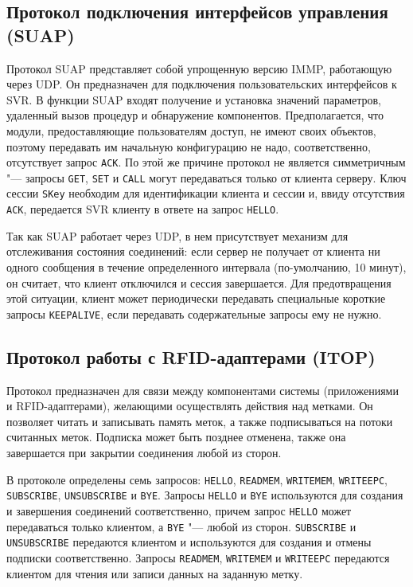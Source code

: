 \subsection{Протокол подключения интерфейсов управления (SUAP)}\label{sec:ch5_suap}

Протокол SUAP представляет собой упрощенную версию IMMP, работающую через UDP. Он предназначен для подключения пользовательских интерфейсов к SVR. В функции SUAP входят получение и установка значений параметров, удаленный вызов процедур и обнаружение компонентов. Предполагается, что модули, предоставляющие пользователям доступ, не имеют своих объектов, поэтому передавать им начальную конфигурацию не надо, соответственно, отсутствует запрос \texttt{ACK}. По этой же причине протокол не является симметричным "--- запросы \texttt{GET}, \texttt{SET} и \texttt{CALL} могут передаваться только от клиента серверу. Ключ сессии \texttt{SKey} необходим для идентификации клиента и сессии и, ввиду отсутствия \texttt{ACK}, передается SVR клиенту в ответе на запрос \texttt{HELLO}.

Так как SUAP работает через UDP, в нем присутствует механизм для отслеживания состояния соединений: если сервер не получает от клиента ни одного сообщения в течение определенного интервала (по-умолчанию, 10 минут), он считает, что клиент отключился и сессия завершается. Для предотвращения этой ситуации, клиент может периодически передавать специальные короткие запросы \texttt{KEEPALIVE}, если передавать содержательные запросы ему не нужно.



\subsection{Протокол работы с RFID-адаптерами (ITOP)}\label{sec:ch5_itop}

Протокол предназначен для связи между компонентами системы (приложениями и RFID-адаптерами), желающими осуществлять действия над метками. Он позволяет читать и записывать память меток, а также подписываться на потоки считанных меток. Подписка может быть позднее отменена, также она завершается при закрытии соединения любой из сторон.

В протоколе определены семь запросов: \texttt{HELLO}, \texttt{READMEM}, \texttt{WRITEMEM}, \texttt{WRITEEPC}, \texttt{SUBSCRIBE}, \texttt{UNSUBSCRIBE} и \texttt{BYE}. Запросы \texttt{HELLO} и \texttt{BYE} используются для создания и завершения соединений соответственно, причем запрос \texttt{HELLO} может передаваться только клиентом, а \texttt{BYE} "--- любой из сторон. \texttt{SUBSCRIBE} и \texttt{UNSUBSCRIBE} передаются клиентом и используются для создания и отмены подписки соответственно. Запросы \texttt{READMEM}, \texttt{WRITEMEM} и \texttt{WRITEEPC} передаются клиентом для чтения или записи данных на заданную метку.

